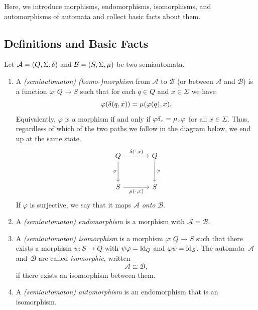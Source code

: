 
Here, we introduce morphisms, endomorphisms, isomorphisms, and automorphisms
of automata and collect basic facts about them.

\subsection{Definitions and Basic Facts}

Let $\mathcal A = (Q, \Sigma, \delta)$ and $\mathcal B = (S, \Sigma, \mu)$
be two semiautomata. 

\begin{enumerate}
	\item A \emph{(semiautomaton) (homo-)morphism} from $\mathcal A$ to $\mathcal B$
	(or between $\mathcal A$ and $\mathcal B$) is a function
	$\varphi \colon Q \to S$
	such that for each $q \in Q$ and $x \in \Sigma$ we have
	\[
	\varphi(\delta(q,x))
	=
	\mu(\varphi(q),x).
	\]
	Equivalently, $\varphi$ is a morphism if and only if
	$\varphi \delta_x = \mu_x \varphi$
	for all $x \in \Sigma$.
	Thus, regardless of which of the two paths we follow in the diagram below,
	we end up at the same state.
	\[
	\begin{tikzcd}[row sep=1cm,column sep=1.25cm]
		Q \ar{r}{\delta(\cdot, x)} \ar[swap]{d}{\varphi}
		& Q \ar{d}{\varphi} \\
		S \ar[swap]{r}{\mu(\cdot, x)}
		& S
	\end{tikzcd}
	\]
	If $\varphi$ is surjective, we say that it maps $\mathcal A$ \emph{onto}
	$\mathcal B$.
	
	\item  A \emph{(semiautomaton) endomorphism}
	is a morphism with $\mathcal A = \mathcal B$.
	
	\item A \emph{(semiautomaton) isomorphism} is a morphism $\varphi \colon Q \to S$ such that
	there exists a morphism $\psi \colon S \to Q$ with $\psi \varphi = \operatorname{id}_Q$
	and $\varphi \psi = \operatorname{id}_S$.
	The automata~$\mathcal A$ 
	and~$\mathcal B$ are called \emph{isomorphic}, written \[ \mathcal A \cong \mathcal B, \] \label{def:isomorphic}
	if there exists an isomorphism between them.
	
	\item A \emph{(semiautomaton) automorphism} is an endomorphism that is an isomorphism.
\end{enumerate}


